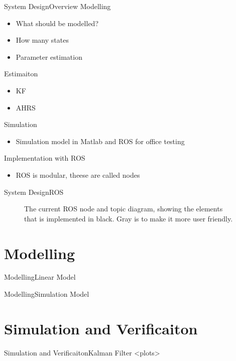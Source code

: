 \documentclass[10pt,handout]{beamer}
\begin{document}
\begin{frame}{System Design}{Overview}
Modelling
\begin{itemize}
\item What should be modelled?
\item How many states
\item Parameter estimation
\end{itemize}

Estimaiton
\begin{itemize}
\item KF
\item AHRS
\end{itemize}

Simulation
\begin{itemize}
\item Simulation model in Matlab and ROS for office testing
\end{itemize}

Implementation with ROS
\begin{itemize}
\item ROS is modular, theese are called nodes
\end{itemize}
\end{frame}

\begin{frame}{System Design}{ROS}
  \begin{figure}
    {\tiny }
	  \caption{\scriptsize The current ROS node and topic diagram, showing the elements that is implemented in black. Gray is to make it more user friendly.}
  \end{figure}
\end{frame}

\section{Modelling}
\begin{frame}{Modelling}{Linear Model}

\end{frame}

\begin{frame}{Modelling}{Simulation Model}

\end{frame}

\section{Simulation and Verificaiton}
\begin{frame}{Simulation and Verificaiton}{Kalman Filter}
<plots>
\end{frame}
\end{document}
